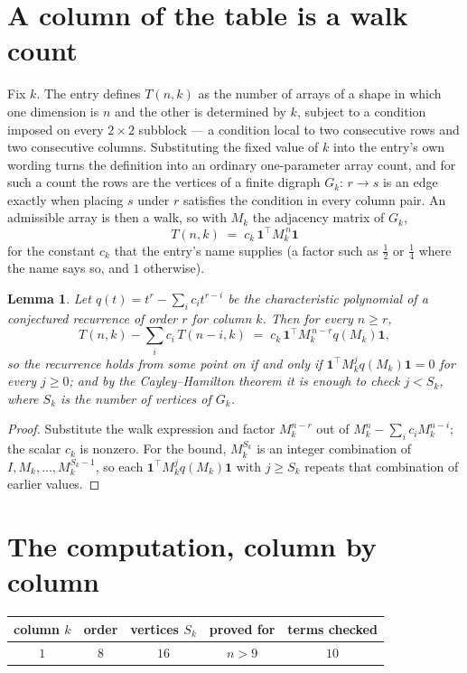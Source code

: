 \documentclass[11pt,a4paper]{article}
\theoremstyle{plain}
\newtheorem{lemma}[theorem]{Lemma}
\theoremstyle{definition}
\begin{document}
\section{A column of the table is a walk count}

Fix $k$. The entry defines $T(n,k)$ as the number of arrays of a shape in which one dimension
is $n$ and the other is determined by $k$, subject to a condition imposed on every
$2\times2$ subblock --- a condition local to two consecutive rows and two consecutive columns.
Substituting the fixed value of $k$ into the entry's own wording turns the definition into an
ordinary one-parameter array count, and for such a count the rows are the vertices of a finite
digraph $G_k$: $r\to s$ is an edge exactly when placing $s$ under $r$ satisfies the condition
in every column pair. An admissible array is then a walk, so with $M_k$ the adjacency matrix
of $G_k$,
\[
T(n,k)\;=\;c_k\,\mathbf{1}^{\!\top}M_k^{\,n}\mathbf{1}
\]
for the constant $c_k$ that the entry's name supplies (a factor such as $\tfrac12$ or
$\tfrac14$ where the name says so, and $1$ otherwise).

\begin{lemma}\label{lem:crit}
Let $q(t)=t^{r}-\sum_i c_it^{r-i}$ be the characteristic polynomial of a conjectured
recurrence of order $r$ for column $k$. Then for every $n\ge r$,
\[
T(n,k)-\sum_i c_i\,T(n-i,k)\;=\;c_k\,\mathbf{1}^{\!\top}M_k^{\,n-r}q(M_k)\mathbf{1},
\]
so the recurrence holds from some point on if and only if
$\mathbf{1}^{\!\top}M_k^{j}q(M_k)\mathbf{1}=0$ for every $j\ge0$; and by the
Cayley--Hamilton theorem it is enough to check $j<S_k$, where $S_k$ is the number of vertices
of $G_k$.
\end{lemma}

\begin{proof}
Substitute the walk expression and factor $M_k^{n-r}$ out of $M_k^{n}-\sum_ic_iM_k^{n-i}$;
the scalar $c_k$ is nonzero. For the bound, $M_k^{S_k}$ is an integer combination of
$I,M_k,\dots,M_k^{S_k-1}$, so each $\mathbf{1}^{\!\top}M_k^{j}q(M_k)\mathbf{1}$ with
$j\ge S_k$ repeats that combination of earlier values.
\end{proof}

\section{The computation, column by column}

\begin{center}
\begin{tabular}{ccccc}
column $k$ & order & vertices $S_k$ & proved for & terms checked \\ \hline
$1$ & $8$ & $16$ & $n>9$ & $10$ \\
\end{tabular}
\end{center}
\end{document}
